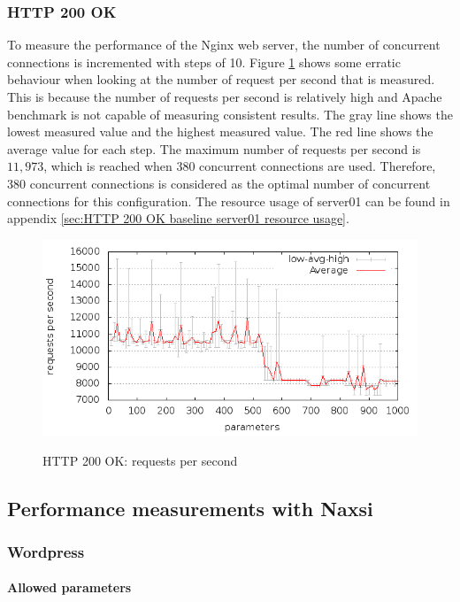 \documentclass[Measurements]{subfiles}
\begin{document}
\subsubsection{HTTP 200 OK}
To measure the performance of the Nginx web server, the number of concurrent connections is incremented with steps of 10. Figure \ref{fig:HTTP 200 OK: requests per second} shows some erratic behaviour when looking at the number of request per second that is measured. This is because the number of requests per second is relatively high and Apache benchmark is not capable of measuring consistent results. The gray line shows the lowest measured value and the highest measured value. The red line shows the average value for each step. The maximum number of requests per second is $11,973$, which is reached when $380$ concurrent connections are used. Therefore, 380 concurrent connections is considered as the optimal number of concurrent connections for this configuration. The resource usage of server01 can be found in appendix \ref{sec:HTTP 200 OK baseline server01 resource usage}.

\begin{figure}[H]
\caption{HTTP 200 OK: requests per second}
\centering
\includegraphics[scale=0.55] {images/results/baseline_200/output.png}
\label{fig:HTTP 200 OK: requests per second}
\end{figure}

\subsection{Performance measurements with Naxsi}

\subsubsection{Wordpress}

\paragraph*{Allowed parameters}
\end{document}
